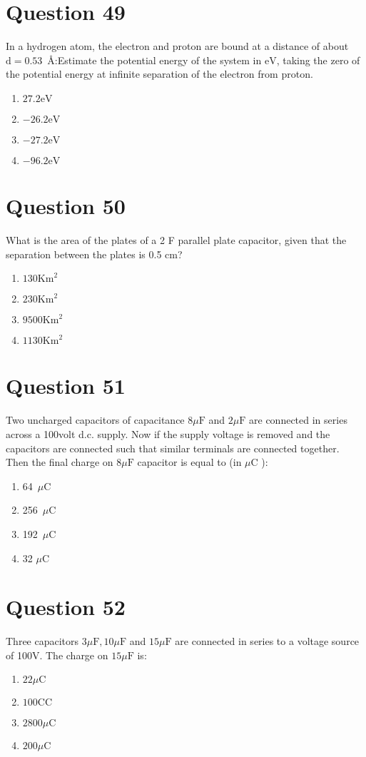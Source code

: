 \documentclass{article}
\begin{document}
\section*{Question 49}
In a hydrogen atom, the electron and proton are bound at a distance of about \(\mathrm{d}=0.53 \) Å:Estimate the potential energy of the system in \(\mathrm{eV}\), taking the zero of the potential energy at infinite separation of the electron from proton.
\begin{enumerate}[label=(\alph*)]
\item \(27.2 \mathrm{eV}\)
\item \(-26.2 \mathrm{eV}\)
\item \(-27.2 \mathrm{eV}\)
\item \(-96.2 \mathrm{eV}\)
\end{enumerate}
\newpage
\section*{Question 50}
What is the area of the plates of a 2 F parallel plate capacitor, given that the separation between the plates is 0.5 cm?
\begin{enumerate}[label=(\alph*)]
\item \(130 \mathrm{Km}^2\)
\item \(230 \mathrm{Km}^2\)
\item \(9500 \mathrm{Km}^2\)
\item \(1130 \mathrm{Km}^2\)
\end{enumerate}
\newpage
\section*{Question 51}
Two uncharged capacitors of capacitance \(8 \mu \mathrm{F}\) and \(2 \mu \mathrm{F}\) are connected in series across a 100volt d.c. supply. Now if the supply voltage is removed and the capacitors are connected such that similar terminals are connected together. Then the final charge on \(8 \mu \mathrm{F}\) capacitor is equal to (in \(\mu \mathrm{C}\) ):\newline
\begin{enumerate}[label=(\alph*)]
\item 64 \(\mu \mathrm{C}\)
\item 256 \(\mu \mathrm{C}\)
\item 192 \(\mu \mathrm{C}\)
\item 32 \(\mu \mathrm{C}\)
\end{enumerate}
\newpage
\section*{Question 52}
Three capacitors \(3 \mu \mathrm{F}, 10 \mu \mathrm{F}\) and \(15 \mu \mathrm{F}\) are connected in series to a voltage source of 100V. The charge on \(15 \mu \mathrm{F}\) is:
\begin{enumerate}[label=(\alph*)]
\item \(22 \mu \mathrm{C}\)
\item \(100\mathrm{CC}\)
\item \(2800 \mu \mathrm{C}\)
\item \(200 \mu \mathrm{C}\)
\end{enumerate}
\newpage
\end{document}
